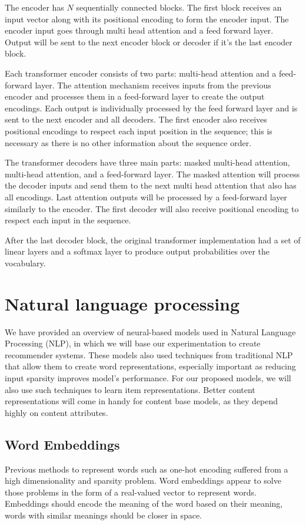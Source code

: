\documentclass{kththesis}
\begin{document}
The encoder has $N$ sequentially connected blocks. The first block receives an input vector along with its positional encoding to form the encoder input. The encoder input goes through multi head attention and a feed forward layer. Output will be sent to the next encoder block or decoder if it's the last encoder block. 

Each transformer encoder consists of two parts: multi-head attention and a feed-forward layer. The attention mechanism receives inputs from the previous encoder and processes them in a feed-forward layer to create the output encodings. Each output is individually processed by the feed forward layer and is sent to the next encoder and all decoders. The first encoder also receives positional encodings to respect each input position in the sequence; this is necessary as there is no other information about the sequence order.

The transformer decoders have three main parts: masked multi-head attention, multi-head attention, and a feed-forward layer. The masked attention will process the decoder inputs and send them to the next multi head attention that also has all encodings. Last attention outputs will be processed by a feed-forward layer similarly to the encoder. The first decoder will also receive positional encoding to respect each input in the sequence.

After the last decoder block, the original transformer implementation had a set of linear layers and a softmax layer to produce output probabilities over the vocabulary.

\section{Natural language processing}
We have provided an overview of neural-based models used in Natural Language Processing (NLP), in which we will base our experimentation to create recommender systems. These models also used techniques from traditional NLP that allow them to create word representations, especially important as reducing input sparsity improves model's performance. For our proposed models, we will also use such techniques to learn item representations. Better content representations will come in handy for content base models, as they depend highly on content attributes.

\subsection{Word Embeddings}\label{Embeddings}
Previous methods to represent words such as one-hot encoding suffered from a high dimensionality and sparsity problem. Word embeddings appear to solve those problems in the form of a real-valued vector to represent words. Embeddings should encode the meaning of the word based on their meaning, words with similar meanings should be closer in space.
\end{document}
